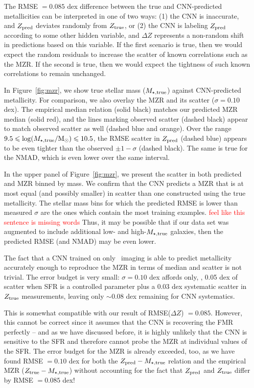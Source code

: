 \documentclass[fleqn,usenatbib]{mnras}
\newcommand{\editorial}[1]{\textcolor{red}{#1}}
\begin{document}
The RMSE $= 0.085$ dex difference between the true and CNN-predicted metallicities can be interpreted in one of two ways: (1) the CNN is inaccurate, and $Z_{\rm pred}$ deviates randomly from $Z_{\rm true}$, or (2) the CNN is labeling $Z_{\rm pred}$ according to some other hidden variable, and $\Delta Z$ represents a non-random shift in predictions based on this variable. If the first scenario is true, then we would expect the random residuals to increase the scatter of known correlations such as the MZR. If the second is true, then we would expect the tightness of such known correlations to remain unchanged.

In Figure~\ref{fig:mzr}, we show true stellar mass ($M_{\star, \rm true}$) against CNN-predicted metallicity. For comparison, we also overlay the \cite{Tremonti2004} MZR and its scatter ($\sigma = 0.10$ dex). The empirical median relation (solid black) matches our predicted MZR median (solid red), and the lines marking observed scatter (dashed black) appear to match observed scatter as well (dashed blue and orange). Over the range $9.5 \leqslant \log (M_{\star, \rm true}/\hbox{$\mathrm{M}_\odot$}) \leqslant 10.5$, the RMSE scatter in $Z_{\rm pred}$ (dashed blue) appears to be even tighter than the observed $\pm 1-\sigma$ (dashed black). The same is true for the NMAD, which is even lower over the same interval.

In the upper panel of Figure~\ref{fig:mzr}, we present the scatter in both predicted and \cite{Tremonti2004} MZR binned by mass. We confirm that the CNN predicts a MZR that is at most equal (and possibly smaller) in scatter than one constructed using the true metallicity. The stellar mass bins for which the predicted RMSE is lower than measured $\sigma$ are the ones which contain the most training examples. \editorial{feel like this sentence is missing words} Thus, it may be possible that if our data set was augmented to include additional low- and high-$M_{\rm \star,true}$ galaxies, then the predicted RMSE (and NMAD) may be even lower.

The fact that a CNN trained on only \sdssi\sdssr\sdssg\ imaging is able to predict metallicity accurately enough to reproduce the MZR in terms of median and scatter is not trivial. The error budget is very small: $\sigma = 0.10$ dex affords only, \eg, 0.05 dex of scatter when SFR is a controlled parameter plus a 0.03 dex systematic scatter in $Z_{\rm true}$ measurements, leaving only $\sim 0.08$ dex remaining for CNN systematics.

This is somewhat compatible with our result of RMSE($\Delta Z$) $= 0.085$. However, this cannot be correct since it assumes that the CNN is recovering the FMR perfectly -- and as we have discussed before, it is highly unlikely that the CNN is sensitive to the SFR and therefore cannot probe the MZR at individual values of the SFR. The error budget for the MZR is already exceeded, too, as we have found RMSE $= 0.10$ dex for both the $Z_{\rm pred}-M_{\star,\rm true}$ relation and the empirical MZR ($Z_{\rm true}-M_{\star,\rm true}$) without accounting for the fact that $Z_{\rm pred}$ and $Z_{\rm true}$ differ by RMSE $= 0.085$ dex!
\end{document}
